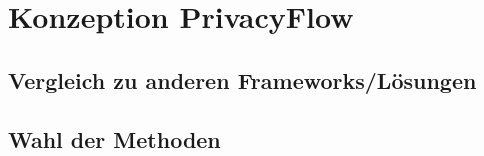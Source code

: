 \chapter{Konzeption PrivacyFlow}
\section{Vergleich zu anderen Frameworks/Lösungen}
\section{Wahl der Methoden}